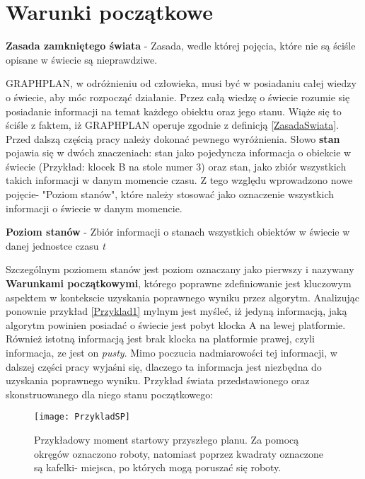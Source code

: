 \section{Warunki początkowe}
    \begin{definition}
        \label{ZasadaSwiata}
        \textbf{Zasada zamkniętego świata} - Zasada, wedle której pojęcia, które nie są ściśle opisane w świecie są nieprawdziwe.
    \end{definition}
    GRAPHPLAN, w odróżnieniu od człowieka, musi być w posiadaniu całej wiedzy o świecie, aby móc rozpocząć działanie. Przez całą wiedzę o świecie rozumie się
    posiadanie informacji na temat każdego obiektu oraz jego stanu. Wiąże się to ściśle z faktem,
    iż GRAPHPLAN operuje zgodnie z definicją \ref{ZasadaSwiata}. 
    Przed dalszą częścią pracy należy dokonać pewnego wyróżnienia. Słowo \textbf{stan} pojawia się w dwóch znaczeniach:
    stan jako pojedyncza informacja o obiekcie w świecie (Przykład: klocek B na stole numer 3) oraz stan, jako zbiór wszystkich takich informacji w danym momencie czasu.
    Z tego względu wprowadzono nowe pojęcie- "Poziom stanów", które należy stosować jako oznaczenie wszystkich informacji o świecie w danym momencie.
    \begin{definition}
        \label{PoziomStanow}
        \textbf{Poziom stanów} - Zbiór informacji o stanach wszystkich obiektów w świecie w danej jednostce czasu \textit{t}
    \end{definition}
    Szczególnym poziomem stanów jest poziom oznaczany jako pierwszy i nazywany \textbf{Warunkami początkowymi}, którego poprawne zdefiniowanie jest kluczowym aspektem w kontekscie
    uzyskania poprawnego wyniku przez algorytm.
    Analizując ponownie przykład \ref{Przyklad1} mylnym jest myśleć, iż jedyną informacją, jaką algorytm powinien posiadać o świecie jest pobyt klocka A na lewej platformie. Również
    istotną informacją jest brak klocka na platformie prawej, czyli informacja, ze jest on \textit{pusty}. Mimo poczucia nadmiarowości tej informacji, w dalszej części pracy wyjaśni
    się, dlaczego ta informacja jest niezbędna do uzyskania poprawnego wyniku.
    Przykład świata przedstawionego oraz skonstruowanego dla niego stanu początkowego:
    \begin{figure}[H]
        \texttt{[image: PrzykladSP]}
        \centering
        \caption{Przykładowy moment startowy przyszłego planu. Za pomocą okręgów oznaczono roboty, natomiast poprzez kwadraty oznaczone są kafelki- miejsca,
        po których mogą poruszać się roboty.}
        \label{PrzykladSP}
    \end{figure}
